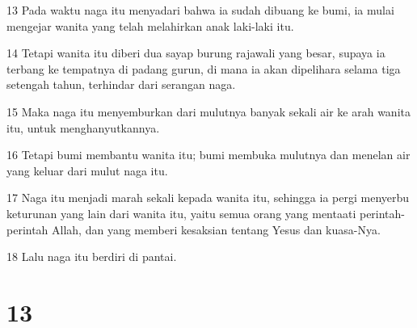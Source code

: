 \par 13 Pada waktu naga itu menyadari bahwa ia sudah dibuang ke bumi, ia mulai mengejar wanita yang telah melahirkan anak laki-laki itu.
\par 14 Tetapi wanita itu diberi dua sayap burung rajawali yang besar, supaya ia terbang ke tempatnya di padang gurun, di mana ia akan dipelihara selama tiga setengah tahun, terhindar dari serangan naga.
\par 15 Maka naga itu menyemburkan dari mulutnya banyak sekali air ke arah wanita itu, untuk menghanyutkannya.
\par 16 Tetapi bumi membantu wanita itu; bumi membuka mulutnya dan menelan air yang keluar dari mulut naga itu.
\par 17 Naga itu menjadi marah sekali kepada wanita itu, sehingga ia pergi menyerbu keturunan yang lain dari wanita itu, yaitu semua orang yang mentaati perintah-perintah Allah, dan yang memberi kesaksian tentang Yesus dan kuasa-Nya.
\par 18 Lalu naga itu berdiri di pantai.

\chapter{13}

